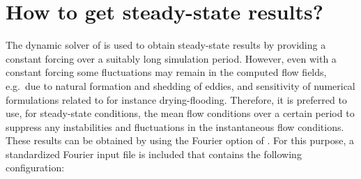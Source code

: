 \section{How to get steady-state results?}\label{Sec:SteadyState}

The dynamic solver of \dflowfm is used to obtain steady-state results by providing a constant forcing over a suitably long simulation period.
However, even with a constant forcing some fluctuations may remain in the computed flow fields, e.g.~due to natural formation and shedding of eddies, and sensitivity of numerical formulations related to for instance drying-flooding.
Therefore, it is preferred to use, for steady-state conditions, the mean flow conditions over a certain period to suppress any instabilities and fluctuations in the instantaneous flow conditions.
These results can be obtained by using the Fourier option of \dflowfm.
For this purpose, a standardized Fourier input file  is included that contains the following configuration:
\vspace{\baselineskip}
\vspace{\baselineskip}
